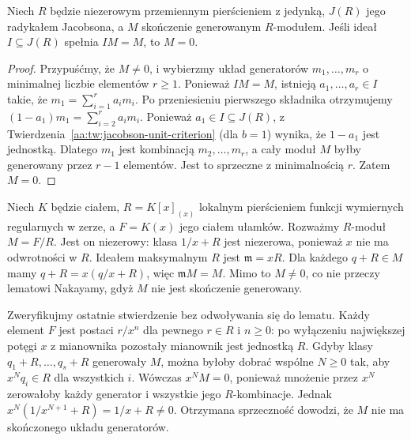 \begin{twierdzenie}
\label{aa:tw:nakayama-jacobson-general}
Niech $R$ będzie niezerowym przemiennym pierścieniem
z jedynką, $J(R)$ jego radykałem Jacobsona, a $M$ skończenie
generowanym $R$-modułem. Jeśli ideał
$I\subseteq J(R)$ spełnia $IM=M$, to $M=0$.
\end{twierdzenie}
\begin{proof}
Przypuśćmy, że $M\neq0$, i wybierzmy układ
generatorów $m_1,\ldots,m_r$ o minimalnej
liczbie elementów $r\ge1$. Ponieważ $IM=M$,
istnieją $a_1,\ldots,a_r\in I$ takie, że
$m_1=\sum_{i=1}^r a_im_i$.
Po przeniesieniu pierwszego składnika otrzymujemy
$(1-a_1)m_1=\sum_{i=2}^r a_im_i$.
Ponieważ $a_1\in I\subseteq J(R)$, z
Twierdzenia~\ref{aa:tw:jacobson-unit-criterion}
(dla $b=1$) wynika, że $1-a_1$ jest jednostką.
Dlatego $m_1$ jest kombinacją $m_2,\ldots,m_r$,
a cały moduł $M$ byłby generowany przez $r-1$
elementów. Jest to sprzeczne z minimalnością $r$.
Zatem $M=0$.
\end{proof}

\begin{przyklad}
\label{aa:prz:nakayama-non-fg-counterexample}
Niech $K$ będzie ciałem,
$R=K[x]_{(x)}$ lokalnym pierścieniem funkcji
wymiernych regularnych w zerze,
a $F=K(x)$ jego ciałem ułamków.
Rozważmy $R$-moduł $M=F/R$.
Jest on niezerowy: klasa $1/x+R$ jest niezerowa,
ponieważ $x$ nie ma odwrotności w $R$.
Ideałem maksymalnym $R$ jest $\mathfrak m=xR$.
Dla każdego $q+R\in M$ mamy
$q+R=x(q/x+R)$, więc $\mathfrak m M=M$.
Mimo to $M\ne0$, co nie przeczy lematowi Nakayamy,
gdyż $M$ nie jest skończenie generowany.

Zweryfikujmy ostatnie stwierdzenie bez odwoływania
się do lematu. Każdy element $F$ jest postaci
$r/x^n$ dla pewnego $r\in R$ i $n\ge0$:
po wyłączeniu największej potęgi $x$ z mianownika
pozostały mianownik jest jednostką $R$.
Gdyby klasy $q_1+R,\ldots,q_s+R$ generowały $M$,
można byłoby dobrać wspólne $N\ge0$ tak,
aby $x^Nq_i\in R$ dla wszystkich $i$.
Wówczas $x^NM=0$, ponieważ mnożenie przez $x^N$
zerowałoby każdy generator i wszystkie jego
$R$-kombinacje. Jednak
$x^N(1/x^{N+1}+R)=1/x+R\ne0$.
Otrzymana sprzeczność dowodzi, że $M$ nie ma
skończonego układu generatorów.
\end{przyklad}

